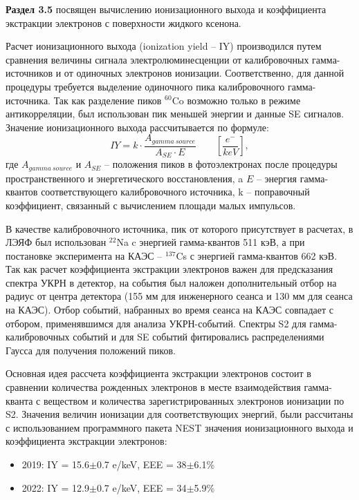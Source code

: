 \textbf{Раздел 3.5} посвящен вычислению ионизационного выхода и коэффициента экстракции электронов с поверхности жидкого ксенона. 

Расчет ионизационного выхода (ionization yield -- IY) производился путем сравнения величины сигнала электролюминесценции от калибровочных гамма-источников и от одиночных электронов ионизации. Соответственно, для данной процедуры требуется выделение одиночного пика калибровочного гамма-источника. Так как разделение пиков $^{60}$Co возможно только в режиме антикорреляции, был использован пик меньшей энергии и данные SE сигналов. Значение ионизационного выхода рассчитывается по формуле:
\begin{equation}
    IY = k\cdot  \frac{A_{gamma\:source}}{A_{SE}\cdot E} \qquad \left[ \frac{e^-}{keV} \right],
    \label{formula:IY_calc_corr}
\end{equation}
где $A_{gamma\:source}$ и $A_{SE}$ -- положения пиков в фотоэлектронах после процедуры пространственного и энергетического восстановления, a $E$ -- энергия гамма-квантов соответствующего калибровочного источника, k -- поправочный коэффициент, связанный с вычислением площади малых импульсов.

В качестве калибровочного источника, пик от которого присутствует в расчетах, в ЛЭЯФ был использован $^{22}$Na c энергией гамма-квантов 511 кэВ, а при постановке эксперимента на КАЭС -- $^{137}$Cs с энергией гамма-квантов 662 кэВ. Так как расчет коэффициента экстракции электронов важен для предсказания спектра УКРН в детектор, на события был наложен дополнительный отбор на радиус от центра детектора (155 мм для инженерного сеанса и 130 мм для сеанса на КАЭС). Отбор событий, набранных во время сеанса на КАЭС совпадает с отбором, применявшимся для анализа УКРН-событий. Спектры S2 для гамма-калибровочных событий и для SE событий фитировались распределениями Гаусса для получения положений пиков.

Основная идея рассчета коэффициента экстракции электронов состоит в сравнении количества рожденных электронов в месте взаимодействия гамма-кванта с веществом и количества зарегистрированных электронов ионизации по S2. 
Значения величин ионизации для соответствующих энергий, были рассчитаны с использованием программного пакета NEST %
 значения ионизационного выхода и коэффициента экстракции электронов:
\begin{itemize}
    \item 2019: IY = 15.6$\pm$0.7 e/keV, EEE = 38$\pm$6.1\%
    \item 2022: IY = 12.9$\pm$0.7 e/keV, EEE = 34$\pm$5.9\%
\end{itemize}

